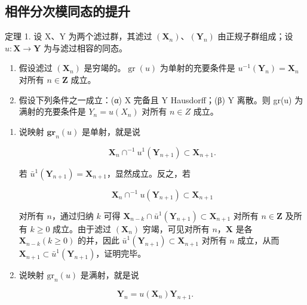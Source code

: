 \subsection{相伴分次模同态的提升}

定理 1. 设 X、Y 为两个滤过群，其滤过 \((\mathbf{X}_n)\)、\((\mathbf{Y}_n)\) 由正规子群组成；设 \(u: \mathbf{X} \to \mathbf{Y}\) 为与滤过相容的同态。

\begin{enumerate}
\def\labelenumi{(\roman{enumi})}
\item
	假设滤过 \((\mathbf{X}_n)\) 是穷竭的。\(\operatorname{gr}(u)\) 为单射的充要条件是 \(u^{-1}(\mathbf{Y}_n) = \mathbf{X}_n\) 对所有 \(n \in \mathbf{Z}\) 成立。
\item
	假设下列条件之一成立：(α) X 完备且 Y Hausdorff；(β) Y 离散。则 gr(u) 为满射的充要条件是 \(Y_{n} = u(X_{n})\) 对所有 \(n \in Z\) 成立。
\end{enumerate}

\begin{enumerate}
\def\labelenumi{(\roman{enumi})}
\tightlist
\item
  说映射 \(\mathbf{gr}_n(u)\) 是单射，就是说

\[
\mathbf {X} _ {n} \cap^ {- 1} u ^ {1} (\mathbf {Y} _ {n + 1}) \subset \mathbf {X} _ {n + 1}.
\]

若 \(\bar{u}^1 (\mathbf{Y}_{n + 1}) = \mathbf{X}_{n + 1}\)，显然成立。反之，若

\[
\mathbf {X} _ {n} \cap^ {- 1} u (\mathbf {Y} _ {n + 1}) \subset \mathbf {X} _ {n + 1}
\]

	对所有 \(n\)，通过归纳 \(k\) 可得 \(\mathbf{X}_{n-k} \cap \bar{u}^1(\mathbf{Y}_{n+1}) \subset \mathbf{X}_{n+1}\) 对所有 \(n \in \mathbf{Z}\) 及所有 \(k \geqslant 0\) 成立。由于滤过 \((\mathbf{X}_n)\) 穷竭，可见对所有 \(n\)，\(\mathbf{X}\) 是各 \(\mathbf{X}_{n-k} (k \geqslant 0)\) 的并，因此 \(\bar{u}^1(\mathbf{Y}_{n+1}) \subset \mathbf{X}_{n+1}\) 对所有 \(n\) 成立，从而 \(\mathbf{X}_{n+1} \subset \bar{u}^1(\mathbf{Y}_{n+1})\)，证明完毕。

\item
  说映射 \(\mathrm{gr}_n(u)\) 是满射，就是说
\end{enumerate}

\[
\mathbf {Y} _ {n} = u (\mathbf {X} _ {n}) \mathbf {Y} _ {n + 1}.
\]

